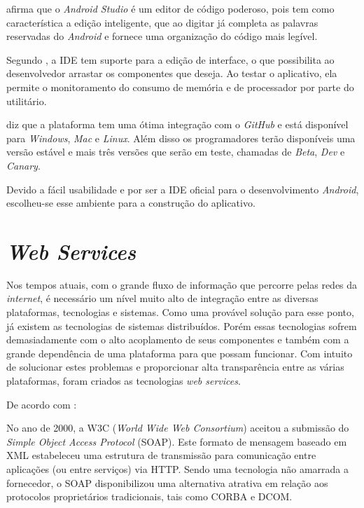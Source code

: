 	\par {} afirma que o \textit{Android Studio} é um editor
de código poderoso, pois tem como característica a edição inteligente, que ao
digitar já completa as palavras reservadas do \textit{Android} e fornece uma
organização do código mais legível.

	\par Segundo , a IDE tem suporte para a edição de
interface, o que possibilita ao desenvolvedor arrastar os componentes que
deseja. Ao testar o aplicativo, ela permite o monitoramento do consumo de
memória e de processador por parte do utilitário.

	\par {} diz que a plataforma tem uma ótima integração com
o \textit{GitHub} e está disponível para \textit{Windows}, \textit{Mac} e
\textit{Linux}. Além disso os programadores terão disponíveis uma versão
estável e mais três versões que serão em teste, chamadas de \textit{Beta},
\textit{Dev} e \textit{Canary}.

	\par Devido a fácil usabilidade e por ser a IDE oficial para o desenvolvimento
\textit{Android}, escolheu-se esse ambiente para a construção do aplicativo.	
	
\section{\textit{Web Services}}
	
	\par Nos tempos atuais, com o grande fluxo de informação que percorre pelas
redes da \textit{internet}, é necessário um nível muito alto de integração entre
as diversas plataformas, tecnologias e sistemas. Como uma provável solução para
esse ponto, já existem as tecnologias de sistemas distribuídos. Porém essas
tecnologias sofrem demasiadamente com o alto acoplamento de seus componentes e
também com a grande dependência de uma plataforma para que possam funcionar. Com
intuito de solucionar estes problemas e proporcionar alta transparência entre
as várias plataformas, foram criados as tecnologias \textit{web services}.
	
	
	\par De acordo com :
	\begin{citacao}
		No ano de 2000, a W3C (\textit{World Wide Web Consortium}) aceitou a submissão
		do \textit{Simple Object Access Protocol} (SOAP). Este formato de mensagem
		baseado em XML estabeleceu uma estrutura de transmissão para comunicação entre
		aplicações (ou entre serviços) via HTTP. Sendo uma tecnologia não amarrada a
		fornecedor, o SOAP disponibilizou uma alternativa atrativa em relação aos
		protocolos proprietários tradicionais, tais como CORBA e DCOM.
	\end{citacao}
	
